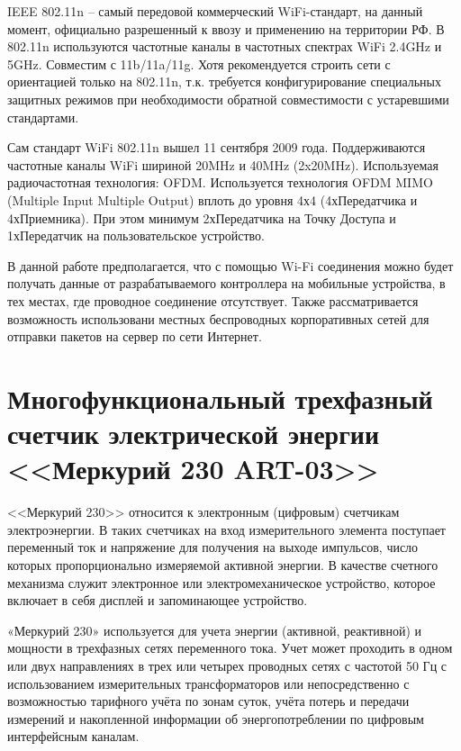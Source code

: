 IEEE 802.11n – самый передовой коммерческий WiFi-стандарт, на данный момент, официально разрешенный к ввозу и применению на территории РФ. В 802.11n используются частотные каналы в частотных спектрах WiFi 2.4GHz и 5GHz. Совместим с 11b/11a/11g. Хотя рекомендуется строить сети с ориентацией только на 802.11n, т.к. требуется конфигурирование специальных защитных режимов при необходимости обратной совместимости с устаревшими стандартами\cite{wifistandarts}.

Сам стандарт WiFi 802.11n вышел 11 сентября 2009 года.
Поддерживаются частотные каналы WiFi шириной 20MHz и 40MHz (2x20MHz).
Используемая радиочастотная технология: OFDM.
Используется технология OFDM MIMO (Multiple Input Multiple Output) вплоть до уровня 4х4 (4хПередатчика и 4хПриемника). При этом минимум 2хПередатчика на Точку Доступа и 1хПередатчик на пользовательское устройство.

В данной работе предполагается, что с помощью Wi-Fi соединения можно будет получать данные от разрабатываемого контроллера на мобильные устройства, в тех местах, где проводное соединение отсутствует. Также рассматривается возможность использовани местных беспроводных корпоративных сетей для отправки пакетов на сервер по сети Интернет.

\newpage

\section{Многофункциональный трехфазный счетчик электрической энергии <<Меркурий 230 ART-03>>}

<<Меркурий 230>> относится к электронным (цифровым) счетчикам электроэнергии. В таких счетчиках на вход измерительного элемента поступает переменный ток и напряжение для получения на выходе импульсов, число которых пропорционально измеряемой активной энергии. В качестве счетного механизма служит электронное или электромеханическое устройство, которое включает в себя дисплей и запоминающее устройство\cite{mercinfo1}. 

«Меркурий 230» используется для учета энергии (активной, реактивной) и мощности в трехфазных сетях переменного тока. Учет может проходить в одном или двух направлениях в трех или четырех проводных сетях с частотой 50 Гц с использованием измерительных трансформаторов или непосредственно с возможностью тарифного учёта по зонам суток, учёта потерь и передачи измерений и накопленной информации об энергопотреблении по цифровым интерфейсным каналам\cite{mercinfo2}.

